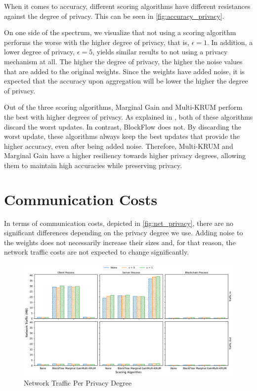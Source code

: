 When it comes to accuracy, different scoring algorithms have different resistances against the degree of privacy. This can be seen in \autoref{fig:accuracy_privacy}.

On one side of the spectrum, we visualize that not using a scoring algorithm performs the worse with the higher degree of privacy, that is, $\epsilon = 1$. In addition, a lower degree of privacy, $\epsilon = 5$, yields similar results to not using a privacy mechanism at all. The higher the degree of privacy, the higher the noise values that are added to the original weights. Since the weights have added noise, it is expected that the accuracy upon aggregation will be lower the higher the degree of privacy.

Out of the three scoring algorithms, Marginal Gain and Multi-KRUM perform the best with higher degrees of privacy. As explained in , both of these algorithms discard the worst updates. In contrast, BlockFlow does not. By discarding the worst update, these algorithms always keep the best updates that provide the higher accuracy, even after being added noise. Therefore, Multi-KRUM and Marginal Gain have a higher resiliency towards higher privacy degrees, allowing them to maintain high accuracies while preserving privacy.

\section{Communication Costs}

In terms of communication costs, depicted in \autoref{fig:net_privacy}, there are no significant differences depending on the privacy degree we use. Adding noise to the weights does not necessarily increase their sizes and, for that reason, the network traffic costs are not expected to change significantly.

\begin{figure}[!h]
    \centering
    \includegraphics[width=\textwidth]{graphics/privacy/traffic.pdf}
    \caption{Network Traffic Per Privacy Degree}
    \label{fig:net_privacy}
\end{figure}

